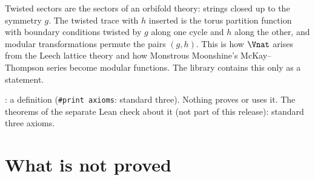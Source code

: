 \begin{physics}
Twisted sectors are the sectors of an orbifold theory: strings closed up to the symmetry $g$. The twisted trace with $h$
inserted is the torus partition function with boundary conditions twisted by $g$ along one cycle and $h$ along the other,
and modular transformations permute the pairs $(g,h)$. This is how $\Vnat$ arises from the Leech lattice theory and how
Monstrous Moonshine's McKay--Thompson series become modular functions. The library contains this only as a statement.
\end{physics}

\begin{status}
: a definition (\texttt{\#print axioms}: standard three). Nothing proves or uses it. The
theorems of the separate Lean check about it (not part of this release): standard three axioms.
\end{status}

\section{What is not proved}\label{l15:sec:notproved}

